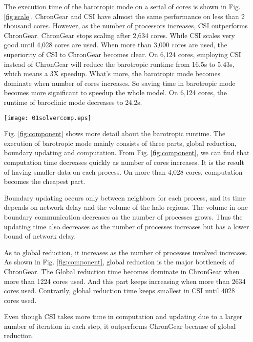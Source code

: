\documentclass{sig-alternate}
\begin{document}
The execution time of the barotropic mode on a serial of cores is shown in Fig. \ref{fig:scale}. 
ChronGear and CSI have almost the same performance on less than 2 thousand cores.
However, as the number of processors increases, CSI outperforms ChronGear. 
ChronGear stops scaling after 2,634 cores. While CSI scales very good until 4,028 cores are used. 
When more than 3,000 cores are used, the superiority of CSI to ChronGear becomes clear. On 6,124 cores, employing CSI instead of ChronGear will reduce the barotropic runtime from 16.5s to 5.43s, which means a 3X speedup. What's more, the barotropic mode becomes dominate when number of cores increases. So saving time in barotropic mode becomes more significant to speedup the whole model. On 6,124 cores, the runtime of baroclinic mode decreases to 24.2s.  

\begin{figure*}
\begin{center}
	\texttt{[image: 01solvercomp.eps]}
\end{center}
\caption[] {Time components of one CSI step in 1 degree POP}
\label{fig:component}
\end{figure*}

Fig. \ref{fig:component} shows more detail about the barotropic runtime. The execution of barotropic mode mainly consists of three parts, global reduction, boundary updating and computation. From Fig. \ref{fig:component}, we can find that computation time decreases quickly  as number of cores increases. It is the result of having smaller data on each process. On more than 4,028 cores, computation becomes the cheapest part. 

Boundary updating occurs only between neighbors for each process, and its time depends on network delay and the volume of the halo regions. The volume in one boundary communication decreases as the number of processes grows. Thus the updating time also decreases as the number of processes increases but has a lower bound of network delay.

As to global reduction, it increases as the number of processes involved increases. As shown in Fig. \ref{fig:component}, global reduction is the major bottleneck of ChronGear. 
The Global reduction time becomes dominate in ChronGear when more than 1224 cores used. And this part keeps increasing when more than 2634 cores used. Contrarily, global reduction time keeps smallest in CSI until 4028 cores used. 

Even though CSI takes more time in computation and updating due to a larger number of iteration in each step, it outperforms ChronGear because of global reduction.
\end{document}
